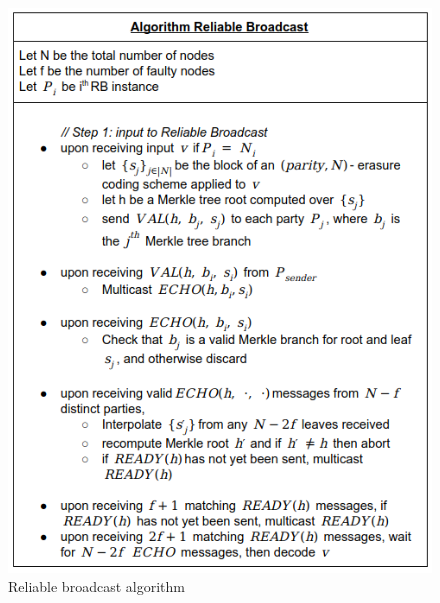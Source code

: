 \begin{figure}[!h]
    \centering
    \includegraphics[scale=0.7]{images/rb_algo.png}
    \caption{Reliable broadcast algorithm\cite{miller2016honey}}
    \label{fig:rb_algo}
\end{figure}

